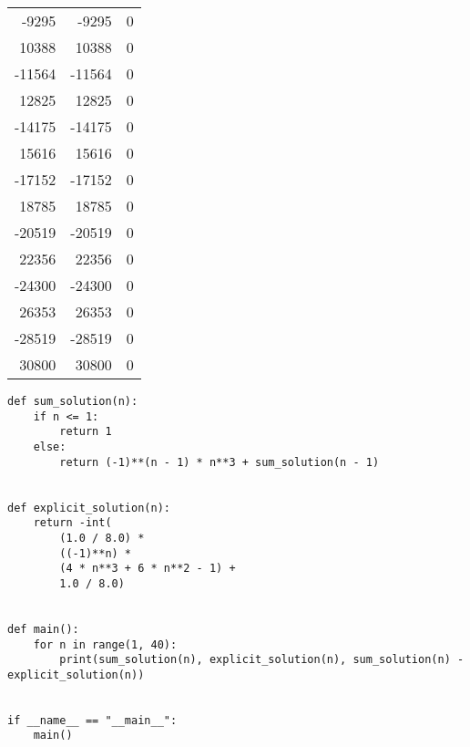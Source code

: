 \documentclass[12pt]{scrartcl}
\begin{document}
\begin{table}[H]
\begin{tabular}{rrc}
            -9295  & -9295  & 0 \\
            10388  & 10388  & 0 \\
            -11564 & -11564 & 0 \\
            12825  & 12825  & 0 \\
            -14175 & -14175 & 0 \\
            15616  & 15616  & 0 \\
            -17152 & -17152 & 0 \\
            18785  & 18785  & 0 \\
            -20519 & -20519 & 0 \\
            22356  & 22356  & 0 \\
            -24300 & -24300 & 0 \\
            26353  & 26353  & 0 \\
            -28519 & -28519 & 0 \\
            30800  & 30800  & 0 \\ \bottomrule
    \end{tabular}
\end{table}

\begin{lstlisting}
def sum_solution(n):
    if n <= 1:
        return 1
    else:
        return (-1)**(n - 1) * n**3 + sum_solution(n - 1)


def explicit_solution(n):
    return -int(
        (1.0 / 8.0) *
        ((-1)**n) *
        (4 * n**3 + 6 * n**2 - 1) +
        1.0 / 8.0)


def main():
    for n in range(1, 40):
        print(sum_solution(n), explicit_solution(n), sum_solution(n) - explicit_solution(n))


if __name__ == "__main__":
    main()
\end{lstlisting}
\end{document}
